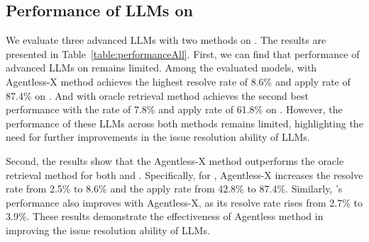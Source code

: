 




    





\subsection{Performance of LLMs on \Swebenchx}
We evaluate three advanced LLMs with two methods on \Swebenchx. The results are presented in Table~\ref{table:performanceAll}. First, we can find that  performance of advanced LLMs on \Swebenchx remains limited. Among the evaluated models, \GPT with Agentless-X method achieves the highest resolve rate of 8.6\% and apply rate of 87.4\% on \Swebenchx. And \Claude with oracle retrieval method achieves the second best performance with the rate of 7.8\% and apply rate of 61.8\% on \Swebenchx. However, the performance of these LLMs across both methods remains limited,  highlighting the need for further improvements in the issue resolution ability of LLMs.


Second, the results show that the Agentless-X method outperforms the oracle retrieval method for both \GPT and \DeepSeek. Specifically, for , Agentless-X increases the resolve rate from 2.5\% to 8.6\% and the apply rate from 42.8\% to 87.4\%. Similarly, \DeepSeek's performance also improves with Agentless-X, as its resolve rate rises from 2.7\% to 3.9\%. These results demonstrate the effectiveness of Agentless method in improving the issue resolution ability of LLMs.

